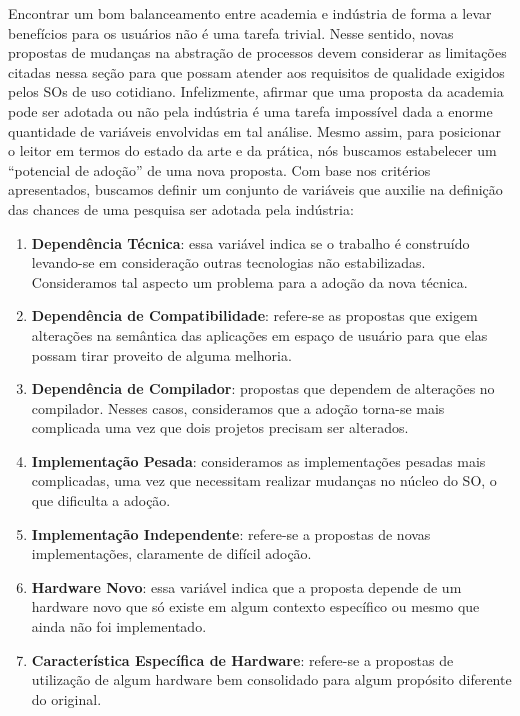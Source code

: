 Encontrar um bom balanceamento entre academia e indústria de forma a levar
benefícios para os usuários não é uma tarefa trivial. Nesse sentido, novas
propostas de mudanças na abstração de processos devem considerar as limitações
citadas nessa seção para que possam atender aos requisitos de qualidade
exigidos pelos SOs de uso cotidiano. Infelizmente, afirmar que uma proposta da
academia pode ser adotada ou não pela indústria é uma tarefa impossível dada a
enorme quantidade de variáveis envolvidas em tal análise. Mesmo assim, para
posicionar o leitor em termos do estado da arte e da prática, nós buscamos
estabelecer um ``potencial de adoção'' de uma nova proposta. Com base nos
critérios apresentados, buscamos definir um conjunto de variáveis que auxilie
na definição das chances de uma pesquisa ser adotada pela indústria:

\begin{enumerate}
  \item
\textbf{Dependência Técnica}: essa variável indica se o trabalho é construído
levando-se em consideração outras tecnologias não estabilizadas. Consideramos
tal aspecto um problema para a adoção da nova técnica.

	\item \textbf{Dependência de Compatibilidade}: refere-se as propostas que
exigem alterações na semântica das aplicações em espaço de usuário para que
elas possam tirar proveito de alguma melhoria.

  \item
\textbf{Dependência de Compilador}: propostas que dependem de alterações no
compilador. Nesses casos, consideramos que a adoção torna-se mais complicada
uma vez que dois projetos precisam ser alterados.

  \item
\textbf{Implementação Pesada}: consideramos as implementações pesadas mais
complicadas, uma vez que necessitam realizar mudanças no núcleo do SO, o que
dificulta a adoção.

  \item
\textbf{Implementação Independente}: refere-se a propostas de novas
implementações, claramente de difícil adoção.

  \item
\textbf{Hardware Novo}: essa variável indica que a proposta depende de um
hardware novo que só existe em algum contexto específico ou mesmo que ainda não
foi implementado.

  \item
\textbf{Característica Específica de Hardware}: refere-se a propostas de
utilização de algum hardware bem consolidado para algum propósito diferente do
original.

\end{enumerate}

